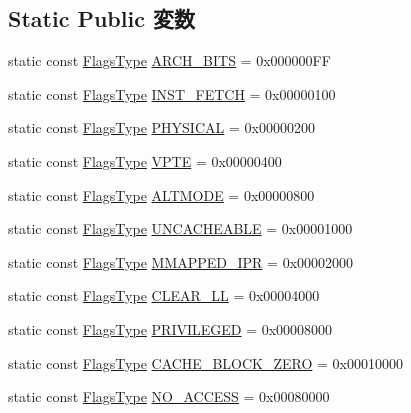 \subsection*{Static Public 変数}
\begin{DoxyCompactItemize}
\item 
static const \hyperlink{classRequest_a2da503161d95c65aea559dbabcf570aa}{FlagsType} \hyperlink{classRequest_aaf4396fbbe70e17e09471bbcf9978a93}{ARCH\_\-BITS} = 0x000000FF
\item 
static const \hyperlink{classRequest_a2da503161d95c65aea559dbabcf570aa}{FlagsType} \hyperlink{classRequest_a1137c9aff3d0aa2d9c0fafeb06ec7bc3}{INST\_\-FETCH} = 0x00000100
\item 
static const \hyperlink{classRequest_a2da503161d95c65aea559dbabcf570aa}{FlagsType} \hyperlink{classRequest_a9c0b7f9771f5173e1f4a7443e785c99c}{PHYSICAL} = 0x00000200
\item 
static const \hyperlink{classRequest_a2da503161d95c65aea559dbabcf570aa}{FlagsType} \hyperlink{classRequest_a58cc46d2f1ce828ebbc76f065fa7fb09}{VPTE} = 0x00000400
\item 
static const \hyperlink{classRequest_a2da503161d95c65aea559dbabcf570aa}{FlagsType} \hyperlink{classRequest_af5696d6c4c536a1c16a3fce36b9741c4}{ALTMODE} = 0x00000800
\item 
static const \hyperlink{classRequest_a2da503161d95c65aea559dbabcf570aa}{FlagsType} \hyperlink{classRequest_a0fc1d6bc92a0567b05130468e04f05f8}{UNCACHEABLE} = 0x00001000
\item 
static const \hyperlink{classRequest_a2da503161d95c65aea559dbabcf570aa}{FlagsType} \hyperlink{classRequest_a49ba1ff56158133aba02dce7a13952cb}{MMAPPED\_\-IPR} = 0x00002000
\item 
static const \hyperlink{classRequest_a2da503161d95c65aea559dbabcf570aa}{FlagsType} \hyperlink{classRequest_ad3bec0fb1cf156170b4f9b3df49b22a6}{CLEAR\_\-LL} = 0x00004000
\item 
static const \hyperlink{classRequest_a2da503161d95c65aea559dbabcf570aa}{FlagsType} \hyperlink{classRequest_aac83867bccac8d23030781df154dc69e}{PRIVILEGED} = 0x00008000
\item 
static const \hyperlink{classRequest_a2da503161d95c65aea559dbabcf570aa}{FlagsType} \hyperlink{classRequest_a4c22f8a3275a06b136b28f633beeee03}{CACHE\_\-BLOCK\_\-ZERO} = 0x00010000
\item 
static const \hyperlink{classRequest_a2da503161d95c65aea559dbabcf570aa}{FlagsType} \hyperlink{classRequest_ab305c2952b5ae966870f325f2bef006c}{NO\_\-ACCESS} = 0x00080000

\end{DoxyCompactItemize}
